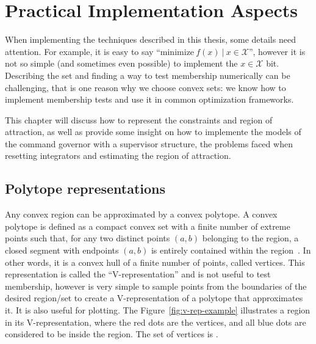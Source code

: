 
\chapter{Practical Implementation Aspects}%
\label{chp:practival-implementation-aspects}

When implementing the techniques described in this thesis, some details need
attention. For example, it is easy to say
\enquote{\(\mathrm{minimize}~f(x)~|~x\in\mathcal{X}\)}, however it is not so
simple (and sometimes even possible) to implement the \(x\in\mathcal{X}\) bit.
Describing the set and finding a way to test membership numerically can be
challenging, that is one reason why we choose convex sets: we know how to
implement membership tests and use it in common optimization frameworks.

This chapter will discuss how to represent the constraints and region of
attraction, as well as provide some insight on how to implemente the models of
the command governor with a supervisor structure, the problems faced when
resetting integrators and estimating the region of attraction.

\section{Polytope representations}%
\label{sec:polytope-representation}

Any convex region can be approximated by a convex polytope. A convex polytope is
defined as a compact convex set with a finite number of extreme points such
that, for any two distinct points \((a,b)\) belonging to the region, a closed
segment with endpoints \((a,b)\) is entirely contained within the
region~\parencite{grünbaum:convex}. In other words, it is a convex hull of a
finite number of points, called vertices. This representation is called the
\enquote{V-representation} and is not useful to test membership, however is very
simple to sample points from the boundaries of the desired region/set to create
a V-representation of a polytope that approximates it. It is also useful for
plotting. The Figure~\ref{fig:v-rep-example} illustrates a region in its
V-representation, where the red dots are the vertices, and all blue dots are
considered to be inside the region. The set of vertices is
.

